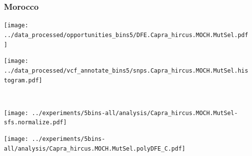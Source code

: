 \subsubsection{Morocco}

\begin{minipage}{0.49\linewidth}
    \texttt{[image: ../data\_processed/opportunities\_bins5/DFE.Capra\_hircus.MOCH.MutSel.pdf]}
\end{minipage}
\begin{minipage}{0.49\linewidth}
    \texttt{[image: ../data\_processed/vcf\_annotate\_bins5/snps.Capra\_hircus.MOCH.MutSel.histogram.pdf]}
\end{minipage}
\\
\begin{minipage}{0.49\linewidth}
    \texttt{[image: ../experiments/5bins-all/analysis/Capra\_hircus.MOCH.MutSel-sfs.normalize.pdf]}
\end{minipage}
\begin{minipage}{0.4\linewidth}
    \texttt{[image: ../experiments/5bins-all/analysis/Capra\_hircus.MOCH.MutSel.polyDFE\_C.pdf]}
\end{minipage}
